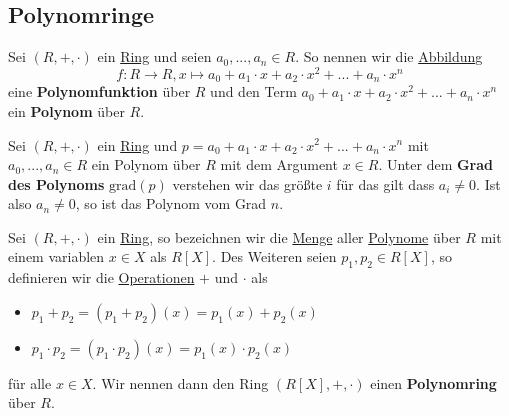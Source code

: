 \documentclass[../../main.tex]{subfiles}
\begin{document}
		\subsection{Polynomringe}
		\label{sub:Polynomringe}
		\begin{definition}
			\label{def:Polynom}
			\label{def:Polynomfunktion}
			Sei $(R,+,\cdot)$ ein \hyperref[def:Ring]{Ring} und seien $a_0,...,a_n \in R$. So nennen wir die \hyperref[def:Abbildung]{Abbildung} $$f:R \rightarrow R, x \mapsto a_0 + a_1 \cdot x + a_2 \cdot x^2 + ... + a_n \cdot x^n$$
			eine \textbf{Polynomfunktion} über $R$ und den Term $a_0 + a_1 \cdot x + a_2 \cdot x^2 + ... + a_n \cdot x^n$ ein \textbf{Polynom} über $R$. 
		\end{definition}
	
		\begin{definition}
			\label{def:GradEinesPolynoms}
			Sei $(R,+,\cdot)$ ein \hyperref[def:Ring]{Ring} und $p = a_0 + a_1 \cdot x + a_2 \cdot x^2 + ... + a_n \cdot x^n$ mit $a_0,...,a_n\in R$ ein Polynom über $R$ mit dem Argument $x \in R$. Unter dem \textbf{Grad des Polynoms} $\textrm{grad}(p)$ verstehen wir das größte $i$ für das gilt dass $a_i \not=0$. Ist also $a_n \not=0$, so ist das Polynom vom Grad $n$.
		\end{definition}
	
		\begin{definition}[Polynomring]
			\label{def:Polynomring}
			Sei $(R,+,\cdot)$ ein \hyperref[def:Ring]{Ring}, so bezeichnen wir die \hyperref[def:Menge]{Menge} aller \hyperref[def:Polynom]{Polynome} über $R$ mit einem variablen $x \in X$ als $R[X]$. Des Weiteren seien $p_1,p_2 \in R[X]$, so definieren wir die \hyperref[def:Operation]{Operationen} $+$ und $\cdot$ als
			\begin{itemize}
				\item $p_1 + p_2 = (p_1 + p_2)(x) = p_1(x) + p_2(x)$
				\item $p_1 \cdot p_2 = (p_1 \cdot p_2)(x) = p_1(x) \cdot p_2(x)$
			\end{itemize}
			für alle $x \in X$. Wir nennen dann den Ring $(R[X],+,\cdot)$ einen \textbf{Polynomring} über $R$.
			
		\end{definition}
		
\end{document}
